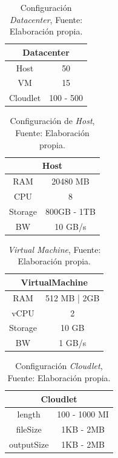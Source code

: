\setcounter{table}{0}
\renewcommand\thetable{\arabic{table}}
\begin{table}[h!]
	\centering
	\begin{tabular}{@{}cc@{}}
		\toprule
		\multicolumn{2}{c}{{\bf Datacenter}} \\ \midrule
		Host              & 50               \\
		VM                & 15                \\
		Cloudlet          & 100 - 500          \\ \bottomrule
		
	\end{tabular}
	\caption{Configuraci\'on \textit{Datacenter}, Fuente: Elaboraci\'on propia.}
	\label{table:datacenter}
\end{table}
 
\setcounter{table}{1}
\renewcommand\thetable{\arabic{table}}
\begin{table}[h!]
	\centering
	\begin{tabular}{@{}cc@{}}
		\toprule
		\multicolumn{2}{c}{{\bf Host}} \\ \midrule
		RAM           & 20480 MB        \\
		CPU           & 8              \\
		Storage       & 800GB - 1TB      \\ \midrule
		BW            & 10 GB/s        
	\end{tabular}
	\caption{Configuraci\'on de \textit{Host}, Fuente: Elaboraci\'on propia.}
	\label{tab:host}
\end{table}

\newpage

\setcounter{table}{2}
\renewcommand\thetable{\arabic{table}}
\begin{table}[h!]
	\centering
	\begin{tabular}{@{}cc@{}}
		\toprule
		\multicolumn{2}{c}{{\bf VirtualMachine}} \\ \midrule
		RAM               & 512 MB | 2GB          \\
		vCPU              & 2           \\
		Storage           & 10 GB                \\ \midrule
		BW                & 1 GB/s              
	\end{tabular}
	\caption{\textit{Virtual Machine}, Fuente: Elaboraci\'on propia.}
	\label{tab:machine}
\end{table}


\setcounter{table}{3}
\renewcommand\thetable{\arabic{table}}
\begin{table}[h!]
	\centering
	\begin{tabular}{@{}cc@{}}
		\toprule
		\multicolumn{2}{c}{{\bf Cloudlet}} \\ \midrule
		length           & 100 - 1000 MI       \\
		fileSize     & 1KB - 2MB      \\
		outputSize           & 1KB - 2MB      \\ \midrule
	  
	\end{tabular}
	\caption{Configuraci\'on \textit{Cloudlet}, Fuente: Elaboraci\'on propia.}
	\label{tab:cloudlet}
\end{table}


